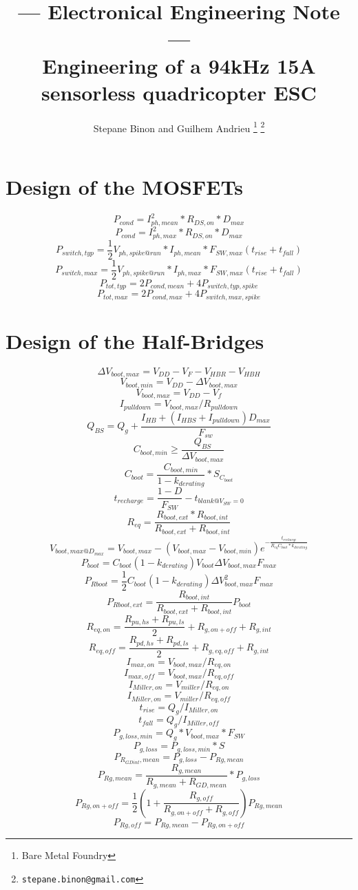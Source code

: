 \documentclass[a4paper, 10pt, conference]{IEEEtran} %
\title{\LARGE \bf
--- Electronical Engineering Note --- \\
Engineering of a 94kHz 15A sensorless quadricopter ESC
}
\author{Stepane Binon and Guilhem Andrieu%
	\thanks{Bare Metal Foundry}
	\thanks{\tt\small stepane.binon@gmail.com}
}
\begin{document}
\maketitle
\thispagestyle{empty}
\pagestyle{empty}


\section{Design of the MOSFETs}

\[
P_{cond} = I_{ph,mean}^2*R_{DS,on}*D_{max}
\]
\[
P_{cond} = I_{ph,max}^2*R_{DS,on}*D_{max}
\]
\[
P_{switch,typ} = \frac{1}{2}V_{ph,spike@run}*I_{ph,mean}*F_{SW,max}(t_{rise}+t_{fall})
\]
\[
P_{switch,max} = \frac{1}{2}V_{ph,spike@run}*I_{ph,max}*F_{SW,max}(t_{rise}+t_{fall})
\]
\[
P_{tot,typ} = 2P_{cond,mean} + 4P_{switch,typ,spike}
\]
\[
P_{tot,max} = 2P_{cond,max
} + 4P_{switch,max,spike}
\]

\section{Design of the Half-Bridges}

\[
\Delta V_{boot,max} = V_{DD} - V_F - V_{HBR} - V_{HBH}
\]
\[
V_{boot,min} = V_{DD}-\Delta V_{boot,max}
\]
\[
V_{boot,max} = V_{DD}-V_f
\]
\[
I_{pulldown} = V_{boot,max} / R_{pulldown}
\]
\[
Q_{BS} = Q_g + \frac{I_{HB} + (I_{HBS} + I_{pulldown}) D_{max}}{F_{sw}}
\]
\[
C_{boot,min} \ge \frac{Q_{BS}}{\Delta V_{boot,max}}
\]
\[
C_{boot} = \frac{C_{boot,min}}{1-{k_{derating}}}*S_{C_{boot}}
\]
\[
t_{recharge} = \frac{1-D}{F_{SW}} - t_{blank@V_{SW}=0}
\]
\[
R_{eq} = \frac{  R_{boot,ext} * R_{boot,int}   }{    R_{boot,ext} + R_{boot,int} }
\]
\[
V_{boot,max @ D_{max}} = V_{boot,max} - (V_{boot,max} - V_{boot,min}) e^{-\frac{t_{recharge}}{R_{eq}C_{boot}*k_{derating}}}
\]
\[
P_{boot} = C_{boot}(1-k_{derating})V_{boot}\Delta V_{boot,max}F_{max}
\]
\[
P_{Rboot} = \frac{1}{2}C_{boot}(1-k_{derating})\Delta V_{boot,max}^2F_{max}
\]
\[
P_{Rboot,ext} = \frac{R_{boot,int}}{R_{boot,ext}+R_{boot,int}}P_{boot}
\]
\[
R_{eq,on} = \frac{R_{pu,hs}+R_{pu,ls}}{2} + R_{g,on+off} + R_{g,int}
\]
\[
R_{eq,off} = \frac{R_{pd,hs}+R_{pd,ls}}{2} + R_{g,eq,off} + R_{g,int}
\]
\[
I_{max,on} = V_{boot,max} / R_{eq,on}
\]
\[
I_{max,off} = V_{boot,max} / R_{eq,off}
\]
\[
I_{Miller,on} = V_{miller} / R_{eq,on}
\]
\[
I_{Miller,on} = V_{miller} / R_{eq,off}
\]
\[
t_{rise} = Q_g/I_{Miller,on}
\]
\[
t_{fall} = Q_g/I_{Miller,off}
\]
\[
P_{g,loss,min} = Q_g * V_{boot,max} * F_{SW}
\]
\[
P_{g,loss} = P_{g,loss,min}*S
\]
\[
P_{R_{GDint},mean} = P_{g,loss}-P_{Rg,mean}
\]
\[
P_{Rg,mean} = \frac{R_{g,mean}}{R_{g,mean}+R_{GD,mean}}*P_{g,loss}
\]
\[
P_{Rg,on+off} = \frac{1}{2}\left(1 + \frac{R_{g,off}}{R_{g,on+off}+R_{g,off}}\right)P_{Rg,mean}
\]
\[
P_{Rg,off} = P_{Rg,mean}-P_{Rg,on+off}
\]
\end{document}

